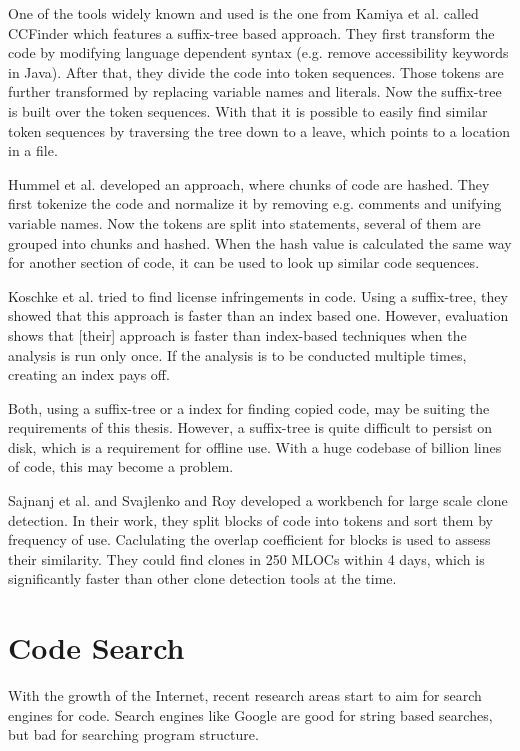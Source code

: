 One of the tools widely known and used is the one from Kamiya et al. called CCFinder\cite{kamiya2002ccfinder} which features a suffix-tree based approach.
They first transform the code by modifying language dependent syntax (e.g. remove accessibility keywords in Java).
After that, they divide the code into token sequences.
Those tokens are further transformed by replacing variable names and literals.
Now the suffix-tree is built over the token sequences. 
With that it is possible to easily find similar token sequences by traversing the tree down to a leave, which points to a location in a file.

Hummel et al.\cite{hummel2010index} developed an approach, where chunks of code are hashed.
They first tokenize the code and normalize it by removing e.g. comments and unifying variable names.
Now the tokens are split into statements, several of them are grouped into chunks and hashed.
When the hash value is calculated the same way for another section of code, it can be used to look up similar code sequences.

Koschke et al. \cite{koschke2014large,koschke2012large} tried to find license infringements in code.
Using a suffix-tree, they showed that this approach is faster than an index based one.
However, \glqq evaluation shows that [their] approach is faster than index-based techniques when the analysis is run only once. If the analysis is to be conducted multiple times, creating an index pays off\grqq \cite{koschke2014large}.

Both, using a suffix-tree or a index for finding copied code, may be suiting the requirements of this thesis.
However, a suffix-tree is quite difficult to persist on disk, which is a requirement for offline use.
With a huge codebase of billion lines of code, this may become a problem.



Sajnanj et al. \cite{sajnani2016sourcerercc} and Svajlenko and Roy \cite{svajlenko2017fast} developed a workbench for large scale clone detection.
In their work, they split blocks of code into tokens and sort them by frequency of use.
Caclulating the overlap coefficient for blocks is used to assess their similarity.
They could find clones in 250 MLOCs within 4 days, which is significantly faster than other clone detection tools at the time.

\section{Code Search}\label{section:related_work/code_search}
With the growth of the Internet, recent research areas start to aim for search engines for code.
Search engines like Google are good for string based searches, but bad for searching program structure.

